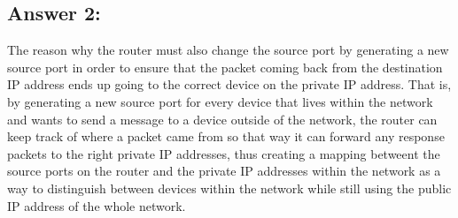 \documentclass[10pt]{article}
\begin{document}
\subsection*{Answer 2:}
The reason why the router must also change the source port by generating a new source port in order to ensure that the packet coming back from the destination IP address ends up going to the correct device on the private IP address. That is, by generating a new source port for every device that lives within the network and wants to send a message to a device outside of the network, the router can keep track of where a packet came from so that way it can forward any response packets to the right private IP addresses, thus creating a mapping betweent the source ports on the router and the private IP addresses within the network as a way to distinguish between devices within the network while still using the public IP address of the whole network.
\end{document}
